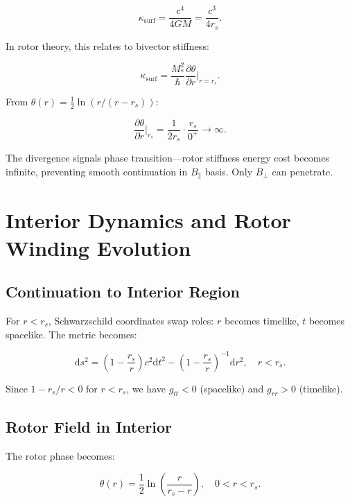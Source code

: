 \documentclass[11pt,a4paper]{article}
\numberwithin{equation}{section}
\theoremstyle{plain}
\theoremstyle{definition}
\theoremstyle{remark}
\renewcommand{\dd}{\mathrm{d}}
\begin{document}
\begin{equation}
\kappa_{\text{surf}} = \frac{c^4}{4GM} = \frac{c^3}{4r_s}.
\end{equation}

In rotor theory, this relates to bivector stiffness:

\begin{equation}
\kappa_{\text{surf}} = \frac{M_*^2}{\hbar} \frac{\partial\theta}{\partial r}\bigg|_{r = r_s}.
\end{equation}

From $\theta(r) = \frac{1}{2}\ln(r/(r - r_s))$:

\begin{equation}
\frac{\partial\theta}{\partial r}\bigg|_{r_s} = \frac{1}{2r_s} \cdot \frac{r_s}{0^+} \to \infty.
\end{equation}

The divergence signals phase transition—rotor stiffness energy cost becomes infinite, preventing smooth continuation in $B_\parallel$ basis. Only $B_\perp$ can penetrate.

\section{Interior Dynamics and Rotor Winding Evolution}
\label{sec:interior}

\subsection{Continuation to Interior Region}

For $r < r_s$, Schwarzschild coordinates swap roles: $r$ becomes timelike, $t$ becomes spacelike. The metric becomes:

\begin{equation}
\dd s^2 = \left(1 - \frac{r_s}{r}\right) c^2 \dd t^2 - \left(1 - \frac{r_s}{r}\right)^{-1} \dd r^2, \quad r < r_s.
\end{equation}

Since $1 - r_s/r < 0$ for $r < r_s$, we have $g_{tt} < 0$ (spacelike) and $g_{rr} > 0$ (timelike).

\subsection{Rotor Field in Interior}

The rotor phase becomes:

\begin{equation}
\theta(r) = \frac{1}{2}\ln\left(\frac{r}{r_s - r}\right), \quad 0 < r < r_s.
\label{eq:theta-interior}
\end{equation}
\end{document}
